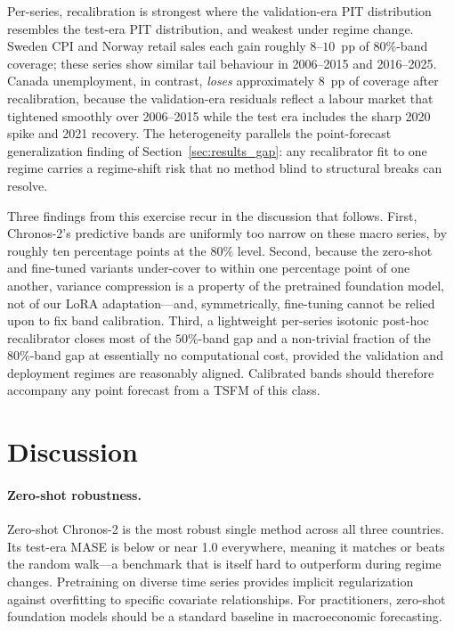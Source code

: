 \documentclass[12pt,a4paper]{article}
\begin{document}
Per-series, recalibration is strongest where the validation-era PIT distribution resembles the test-era PIT distribution, and weakest under regime change. Sweden CPI and Norway retail sales each gain roughly $8$--$10$~pp of $80\%$-band coverage; these series show similar tail behaviour in 2006--2015 and 2016--2025. Canada unemployment, in contrast, \emph{loses} approximately $8$~pp of coverage after recalibration, because the validation-era residuals reflect a labour market that tightened smoothly over 2006--2015 while the test era includes the sharp 2020 spike and 2021 recovery. The heterogeneity parallels the point-forecast generalization finding of Section~\ref{sec:results_gap}: any recalibrator fit to one regime carries a regime-shift risk that no method blind to structural breaks can resolve.

Three findings from this exercise recur in the discussion that follows. First, Chronos-2's predictive bands are uniformly too narrow on these macro series, by roughly ten percentage points at the $80\%$ level. Second, because the zero-shot and fine-tuned variants under-cover to within one percentage point of one another, variance compression is a property of the pretrained foundation model, not of our LoRA adaptation---and, symmetrically, fine-tuning cannot be relied upon to fix band calibration. Third, a lightweight per-series isotonic post-hoc recalibrator closes most of the $50\%$-band gap and a non-trivial fraction of the $80\%$-band gap at essentially no computational cost, provided the validation and deployment regimes are reasonably aligned. Calibrated bands should therefore accompany any point forecast from a TSFM of this class.


\section{Discussion}
\label{sec:discussion}

\paragraph{Zero-shot robustness.}
Zero-shot Chronos-2 is the most robust single method across all three countries. Its test-era MASE is below or near 1.0 everywhere, meaning it matches or beats the random walk---a benchmark that is itself hard to outperform during regime changes. Pretraining on diverse time series provides implicit regularization against overfitting to specific covariate relationships. For practitioners, zero-shot foundation models should be a standard baseline in macroeconomic forecasting.
\end{document}
